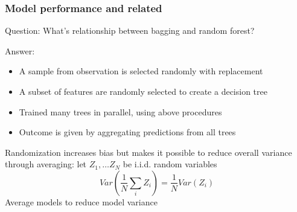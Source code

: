\documentclass[11pt]{beamer}
\begin{document}
\begin{frame}
\frametitle{Model performance and related}
\begin{block}{Question:}
	What’s relationship between bagging and random forest?
\end{block}
\begin{block}{Answer:}
	\begin{itemize}
		\item A sample from observation is selected randomly with replacement
		\item A subset of features are randomly selected to create a decision tree
		\item Trained many trees in parallel, using above procedures
		\item Outcome is given by aggregating predictions from all trees
	\end{itemize}
	Randomization increases bias but makes it possible to reduce overall variance through averaging: let $Z_1,\ldots Z_N$ be i.i.d. random variables
	\[
		Var\left(\frac{1}{N}\sum_{i}Z_i\right) = \frac{1}{N}Var(Z_i)
	\]
	Average models to reduce model variance
\end{block}
\end{frame}
\end{document}
